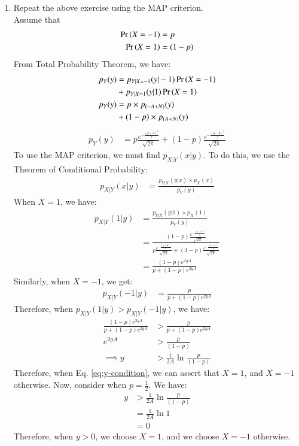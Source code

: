 \documentclass[journal,12pt,twocolumn]{IEEEtran}
\renewcommand\thesection{\arabic{section}}
\begin{document}
\begin{enumerate}[label=\thesection.\arabic*
,ref=\thesection.\theenumi]
  \item Repeat the above exercise using the MAP criterion.
\\
\solution
Assume that 
\begin{align}
    \Pr\left(X = -1\right) &= p\\
    \Pr\left(X = 1\right) &= (1-p)
\end{align}
From Total Probability Theorem,
we have:
\begin{align}
\nonumber p_Y(y) &= p_{Y|X = -1}(y|-1) \Pr\left(X = -1\right) \\
&+ p_{Y| X = 1}(y|1) \Pr\left(X = 1\right) \\
p_Y(y) &=  p \times p_{(-A + N)}(y) \\
&+ (1-p) \times p_{(A+N)} (y) 
\end{align}
\begin{align}
    p_Y(y) &=  p \frac{e^{-\frac{(y+A)^2}{2}}}{\sqrt{2\pi}} + \left(1-p\right) \frac{e^{-\frac{(y-A)^2}{2}}}{\sqrt{2\pi}}
\end{align}
To use the MAP criterion, we must find $p_{X|Y}(x|y)$. To do this, we use the Theorem of Conditional Probability:
\begin{align}
    p_{X|Y}(x|y) &= \frac{p_{Y|X}(y|x) \times p_X(x)}{p_Y(y)}
\end{align}
When $X=1$, we have:
\begin{align}
    p_{X|Y}(1|y) &= \frac{p_{Y|X}(y|1) \times p_X(1)}{p_Y(y)} \\
    &= \frac{\left(1-p\right) \frac{e^{-\frac{(y-A)^2}{2}}}{\sqrt{2\pi}}}{ p \frac{e^{-\frac{(y+A)^2}{2}}}{\sqrt{2\pi}} + \left(1-p\right) \frac{e^{-\frac{(y-A)^2}{2}}}{\sqrt{2\pi}}} \\
    &= \frac{\left(1-p\right) e^{2yA}}{p + \left(1-p\right) e^{2yA}}
\end{align}
Similarly, when $X = -1$, we get:
\begin{align}
    p_{X|Y}(-1|y) &= \frac{p}{p + \left(1-p\right) e^{2yA}} 
\end{align}
Therefore, when $ p_{X|Y}(1|y) >  p_{X|Y}(-1|y)$, we have:
\begin{align}
    \frac{\left(1-p\right) e^{2yA}}{p + \left(1-p\right) e^{2yA}} &> \frac{p}{p + \left(1-p\right) e^{2yA}} \\
    e^{2yA} &> \frac{p}{\left(1-p\right)} \\
    \label{eq:y-condition}
    \implies y &> \frac{1}{2A} \ln{\frac{p}{\left(1-p\right)}}
\end{align}
Therefore, when Eq. \eqref{eq:y-condition}, we can assert that $X = 1$, and $X = -1$ otherwise.
Now, consider when $p = \frac{1}{2} $.
We have:
\begin{align}
    y &> \frac{1}{2A} \ln{\frac{p}{\left(1-p\right)}} \\
    &= \frac{1}{2A} \ln{1} \\
    &= 0
\end{align}
Therefore, when $y > 0$, we choose $X = 1$, and we choose $X = -1$ otherwise.


\end{enumerate}
\end{document}
